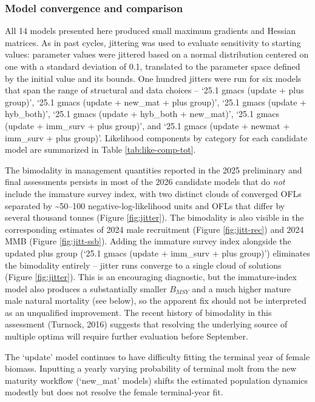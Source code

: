 \documentclass[
]{article}
\begin{document}
\subsubsection{Model convergence and comparison}\label{model-convergence-and-comparison}

All 14 models presented here produced small maximum gradients and Hessian matrices. As in past cycles, jittering was used to evaluate sensitivity to starting values: parameter values were jittered based on a normal distribution centered on one with a standard deviation of 0.1, translated to the parameter space defined by the initial value and its bounds. One hundred jitters were run for six models that span the range of structural and data choices -- `25.1 gmacs (update + plus group)', `25.1 gmacs (update + new\_mat + plus group)', `25.1 gmacs (update + hyb\_both)', `25.1 gmacs (update + hyb\_both + new\_mat)', `25.1 gmacs (update + imm\_surv + plus group)', and `25.1 gmacs (update + newmat + imm\_surv + plus group)'. Likelihood components by category for each candidate model are summarized in Table \ref{tab:like-comp-tot}.

The bimodality in management quantities reported in the 2025 preliminary and final assessments persists in most of the 2026 candidate models that do \emph{not} include the immature survey index, with two distinct clouds of converged OFLs separated by \textasciitilde50--100 negative-log-likelihood units and OFLs that differ by several thousand tonnes (Figure \ref{fig:jitter}). The bimodality is also visible in the corresponding estimates of 2024 male recruitment (Figure \ref{fig:jitt-rec}) and 2024 MMB (Figure \ref{fig:jitt-ssb}). Adding the immature survey index alongside the updated plus group (`25.1 gmacs (update + imm\_surv + plus group)') eliminates the bimodality entirely -- jitter runs converge to a single cloud of solutions (Figure \ref{fig:jitter}). This is an encouraging diagnostic, but the immature-index model also produces a substantially smaller \(B_{MSY}\) and a much higher mature male natural mortality (see below), so the apparent fix should not be interpreted as an unqualified improvement. The recent history of bimodality in this assessment (Turnock, 2016) suggests that resolving the underlying source of multiple optima will require further evaluation before September.

The `update' model continues to have difficulty fitting the terminal year of female biomass. Inputting a yearly varying probability of terminal molt from the new maturity workflow (`new\_mat' models) shifts the estimated population dynamics modestly but does not resolve the female terminal-year fit.
\end{document}
